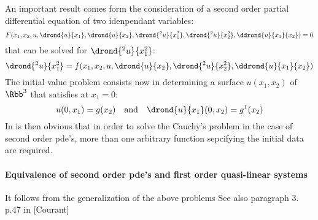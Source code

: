 An important result comes form the consideration of a second order partial differential equation of two idenpendant variables:
\begin{equation}
  \label{eq:2nd_order_pde}
  F(x_1,x_2,u,\drond{u}{x_1},\drond{u}{x_2},\drond{^2u}{x^2_1},\drond{^2u}{x^2_2},\ddrond{u}{x_1}{ x_2})=0
\end{equation}
that can be solved for $\drond{^2u}{x^2_1}$:
\begin{equation}
  \label{eq:2nd_order_pde_normal}
  \drond{^2u}{x^2_1} = f(x_1,x_2,u,\drond{u}{x_2},\drond{^2u}{x^2_2},\ddrond{u}{x_1}{ x_2})
\end{equation}
The initial value problem consists now in determining a surface $u(x_1,x_2)$ of $\Rbb^3$ that satisfies at $x_1=0$:
\begin{equation}
  \label{eq:IC_Cauchy_2ndorder}
  u(0,x_1)=g(x_2) \quad \text{and} \quad \drond{u}{x_1}(0,x_2)=g^1(x_2)
\end{equation}
In is then obvious that in order to solve the Cauchy's problem in the case of second order pde's, more than one arbitrary function sepcifying the initial data are required. 
\paragraph{Equivalence of second order pde's and first order quasi-linear systems}
\cite[p.43]{Courant}It follows from the generalization of the above problems
See also paragraph 3. p.47 in [Courant]
